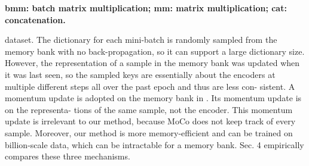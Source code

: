 \documentclass[10pt,twocolumn]{article}  %
\begin{document}

\vspace{-3em} %
\textbf{\small bmm: batch matrix multiplication; mm: matrix multiplication; cat: concatenation.}



dataset. The dictionary
for each mini-batch is randomly sampled from the memory
bank with no back-propagation, so it can support a large
dictionary size. However, the representation of a sample in 
the memory bank was updated when it was last seen, so the
sampled keys are essentially about the encoders at multiple
different steps all over the past epoch and thus are less con-
sistent. A momentum update is adopted on the memory
bank in \cite{61_wu2018unsupervised}. Its momentum update is on the representa-
tions of the same sample, not the encoder. This momentum
update is irrelevant to our method, because MoCo does not
keep track of every sample. Moreover, our method is more
memory-efficient and can be trained on billion-scale data,
which can be intractable for a memory bank.
Sec. 4 empirically compares these three mechanisms.
\end{document}
